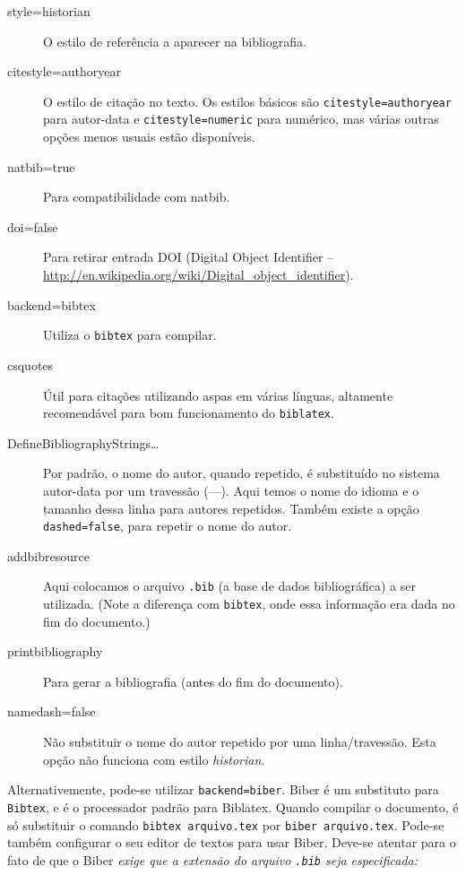 \begin{description}
\item[style=historian] O estilo de referência a aparecer na bibliografia.
\item[citestyle=authoryear] O estilo de citação no texto. Os estilos básicos são \texttt{citestyle=authoryear} para autor-data e \texttt{citestyle=numeric} para numérico, mas várias outras opções menos usuais estão disponíveis.
\item[natbib=true] Para compatibilidade com natbib.
\item[doi=false] Para retirar entrada \textsc{DOI} (Digital Object Identifier -- \url{http://en.wikipedia.org/wiki/Digital_object_identifier}).
\item[backend=bibtex] Utiliza o \texttt{bibtex} para compilar.
\item[csquotes] Útil para citações utilizando aspas em várias línguas, altamente recomendável para bom funcionamento do \texttt{biblatex}.
\item[DefineBibliographyStrings\ldots] Por padrão, o nome do autor, quando repetido, é substituído no sistema autor-data por um travessão (---). Aqui temos o nome do idioma e o tamanho dessa linha para autores repetidos. Também existe a opção \texttt{dashed=false}, para repetir o nome do autor.
\item[addbibresource] Aqui colocamos o arquivo \texttt{.bib} (a base de dados bibliográfica) a ser utilizada. (Note a diferença com \texttt{bibtex}, onde essa informação era dada no fim do documento.)
\item[printbibliography] Para gerar a bibliografia (antes do fim do documento).
\item[namedash=false] Não substituir o nome do autor repetido por uma linha/travessão. Esta opção não funciona com estilo \textit{historian}.
\end{description}

Alternativemente, pode-se utilizar \texttt{backend=biber}. \textsf{Biber} é um substituto para \texttt{Bibtex}, e é o processador padrão para \textsf{Biblatex}. Quando compilar o documento, é só substituir o comando \verb+bibtex arquivo.tex+ por \verb+biber arquivo.tex+. Pode-se também configurar o seu editor de textos para usar \textsf{Biber}. Deve-se atentar para o fato de que o \textsf{Biber} \textit{exige que a extensão do arquivo \texttt{.bib} seja especificada:}

\begin{verbatim}

\end{verbatim}

